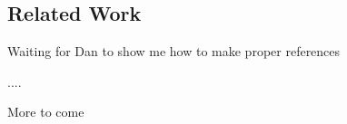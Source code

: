 \subsection{Related Work}
Waiting for Dan to show me how to make proper references

....

More to come

\vspace{10mm}

%
%
%
